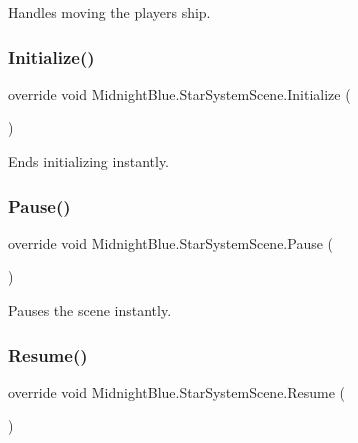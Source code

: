 Handles moving the players ship. 

\hypertarget{class_midnight_blue_1_1_star_system_scene_a1b593cd45d0f1b6c02f17ec5dd1033ca}{}\label{class_midnight_blue_1_1_star_system_scene_a1b593cd45d0f1b6c02f17ec5dd1033ca} 
\subsubsection{\texorpdfstring{Initialize()}{Initialize()}}
{\footnotesize\ttfamily override void Midnight\+Blue.\+Star\+System\+Scene.\+Initialize (\begin{DoxyParamCaption}{ }\end{DoxyParamCaption})\hspace{0.3cm}{\ttfamily [inline]}}



Ends initializing instantly. 

\hypertarget{class_midnight_blue_1_1_star_system_scene_a04e8bfcb31eebfd859c4bd543f0bb6f9}{}\label{class_midnight_blue_1_1_star_system_scene_a04e8bfcb31eebfd859c4bd543f0bb6f9} 
\subsubsection{\texorpdfstring{Pause()}{Pause()}}
{\footnotesize\ttfamily override void Midnight\+Blue.\+Star\+System\+Scene.\+Pause (\begin{DoxyParamCaption}{ }\end{DoxyParamCaption})\hspace{0.3cm}{\ttfamily [inline]}}



Pauses the scene instantly. 

\hypertarget{class_midnight_blue_1_1_star_system_scene_aefbf0750a7ce153b923bcabb132e4875}{}\label{class_midnight_blue_1_1_star_system_scene_aefbf0750a7ce153b923bcabb132e4875} 
\subsubsection{\texorpdfstring{Resume()}{Resume()}}
{\footnotesize\ttfamily override void Midnight\+Blue.\+Star\+System\+Scene.\+Resume (\begin{DoxyParamCaption}{ }\end{DoxyParamCaption})\hspace{0.3cm}{\ttfamily [inline]}}



